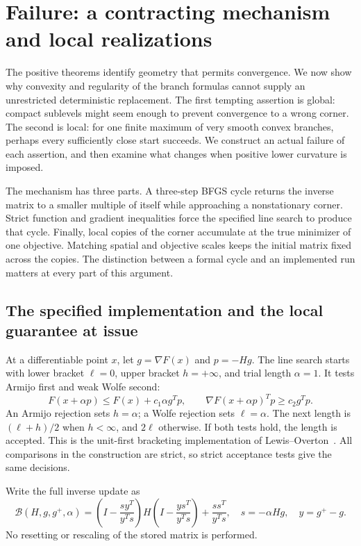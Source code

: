 \section{Failure: a contracting mechanism and local realizations}
\label{art:failure}

The positive theorems identify geometry that permits convergence. We now show
why convexity and regularity of the branch formulas cannot supply an
unrestricted deterministic replacement. The first tempting assertion is
global: compact sublevels might seem enough to prevent convergence to a wrong
corner. The second is local: for one finite maximum of very smooth convex
branches, perhaps every sufficiently close start succeeds. We construct an
actual failure of each assertion, and then examine what changes when positive
lower curvature is imposed.

The mechanism has three parts. A three-step BFGS cycle returns the inverse
matrix to a smaller multiple of itself while approaching a nonstationary
corner. Strict function and gradient inequalities force the specified line
search to produce that cycle. Finally, local copies of the corner accumulate
at the true minimizer of one objective. Matching spatial and objective scales
keeps the initial matrix fixed across the copies. The distinction between a
formal cycle and an implemented run matters at every part of this argument.

\subsection{The specified implementation and the local guarantee at issue}
At a differentiable point $x$, let $g=\nabla F(x)$ and $p=-Hg$.
The line search starts with lower bracket $\ell=0$, upper bracket
$h=+\infty$, and trial length $\alpha=1$. It tests Armijo first and weak
Wolfe second:
\begin{equation}\label{art:failure_tests}
 F(x+\alpha p)\le F(x)+c_1\alpha g^Tp,
 \qquad \nabla F(x+\alpha p)^Tp\ge c_2g^Tp.
\end{equation}
An Armijo rejection sets $h=\alpha$; a Wolfe rejection sets $\ell=\alpha$.
The next length is $(\ell+h)/2$ when $h<\infty$, and $2\ell$ otherwise.
If both tests hold, the length is accepted. This is the unit-first
bracketing implementation of Lewis--Overton~\cite[Algorithm~4.6]{LO}.
All comparisons in the construction are strict, so strict acceptance tests
give the same decisions.

Write the full inverse update as
\begin{equation}\label{art:failure_update}
 \mathcal B(H,g,g^+,\alpha)
 =\left(I-\frac{sy^T}{y^Ts}\right)H
  \left(I-\frac{ys^T}{y^Ts}\right)+\frac{ss^T}{y^Ts},
 \quad s=-\alpha Hg,\quad y=g^+-g.
\end{equation}
No resetting or rescaling of the stored matrix is performed.

